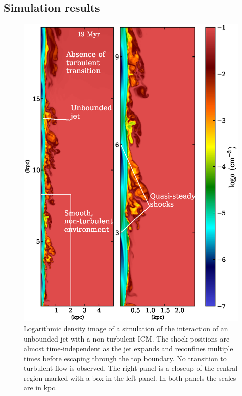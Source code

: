 \subsection{Simulation results} \label{s:jet_stream}
\begin{figure}
\includegraphics[width=\linewidth]{njm.eps}
\caption{Logarithmic density image of a simulation of the interaction of an unbounded jet with a non-turbulent ICM. The shock positions are almost time-independent as the jet expands and reconfines multiple times before escaping through the top boundary. No transition to turbulent flow is observed. The right panel is a closeup of the central region marked with a box in the left panel. In both panels the scales are in kpc.}
\label{f:u_jet}
\end{figure}

